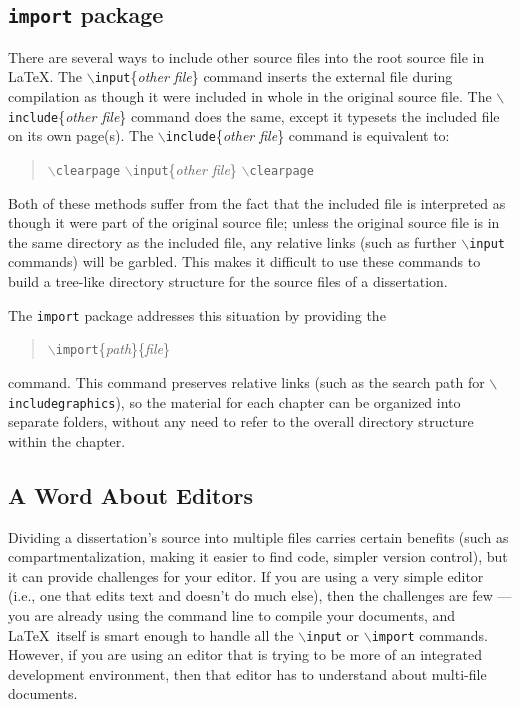 \subsection{\texttt{import} package}
There are several ways to include other source files into the root source file in \LaTeX.
The $\backslash$\texttt{input}\{{\it other file}\} command inserts the external file during compilation as though it were included in whole in the original source file.
The $\backslash$\texttt{include}\{{\it other file}\} command does the same, except it typesets the included file on its own page(s).
The $\backslash$\texttt{include}\{{\it other file}\} command is equivalent to:
\begin{quotation}%
$\backslash$\texttt{clearpage} $\backslash$\texttt{input}\{{\it other file}\} $\backslash$\texttt{clearpage}
\end{quotation}%
Both of these methods suffer from the fact that the included file is interpreted as though it were part of the original source file; unless the original source file is in the same directory as the included file, any relative links (such as further $\backslash$\texttt{input} commands) will be garbled.
This makes it difficult to use these commands to build a tree-like directory structure for the source files of a dissertation.

The \texttt{import} package addresses this situation by providing the
\begin{quotation}%
$\backslash$\texttt{import}\{{\it path}\}\{{\it file}\}
\end{quotation}%
command.
This command preserves relative links (such as the search path for $\backslash$\texttt{includegraphics}), so the material for each chapter can be organized into separate folders, without any need to refer to the overall directory structure within the chapter.

\subsection{A Word About Editors}
Dividing a dissertation's source into multiple files carries certain benefits (such as compartmentalization, making it easier to find code, simpler version control), but it can provide challenges for your editor.
If you are using a very simple editor (i.e., one that edits text and doesn't do much else), then the challenges are few --- you are already using the command line to compile your documents, and \LaTeX\ itself is smart enough to handle all the $\backslash$\texttt{input} or $\backslash$\texttt{import} commands.
However, if you are using an editor that is trying to be more of an integrated development environment, then that editor has to understand about multi-file documents.

